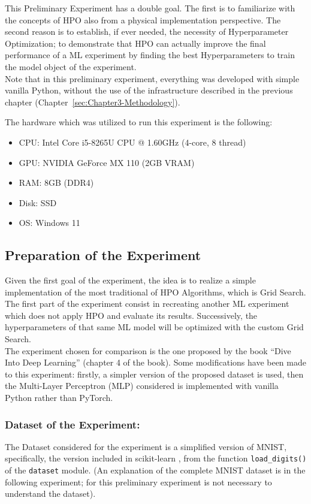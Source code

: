 This Preliminary Experiment has a double goal.
The first is to familiarize with the concepts of HPO also from a physical implementation perspective.
The second reason is to establish, if ever needed, the necessity of Hyperparameter Optimization; to demonstrate that HPO can actually improve the final performance of a ML experiment by finding the best Hyperparameters to train the model object of the experiment.
\\[0.3cm]Note that in this preliminary experiment, everything was developed with simple vanilla Python, without the use of the infrastructure described in the previous chapter (Chapter~\ref{sec:Chapter3-Methodology}).

The hardware which was utilized to run this experiment is the following:
\begin{itemize}[itemsep=0.1cm]
    \item CPU: Intel Core i5-8265U CPU @ 1.60GHz (4-core, 8 thread)
    \item GPU: NVIDIA GeForce MX 110 (2GB VRAM)
    \item RAM: 8GB (DDR4)
    \item Disk: SSD
    \item OS: Windows 11
\end{itemize}

\subsection{Preparation of the Experiment}

Given the first goal of the experiment, the idea is to realize a simple implementation of the most traditional of HPO Algorithms, which is Grid Search.
\\[0.3cm]The first part of the experiment consist in recreating another ML experiment which does not apply HPO and evaluate its results. Successively, the hyperparameters of that same ML model will be optimized with the custom Grid Search.
\\[0.3cm]The experiment chosen for comparison is the one proposed by the book “Dive Into Deep Learning” \cite{Tesi-1.6} (chapter 4 of the book). Some modifications have been made to this experiment: firstly, a simpler version of the proposed dataset is used, then the Multi-Layer Perceptron (MLP) considered is implemented with vanilla Python rather than PyTorch.

\subsubsection{Dataset of the Experiment:}
The Dataset considered for the experiment is a simplified version of MNIST, specifically, the version included in scikit-learn \cite{scikit-learn}, from the function \texttt{load\_digits()} of the \texttt{dataset} module. (An explanation of the complete MNIST dataset is in the following experiment; for this preliminary experiment is not necessary to understand the dataset).

